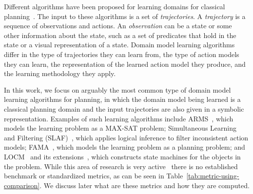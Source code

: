 \documentclass{article}
\theoremstyle{definition}
\theoremstyle{remark}
\newif\ifaddcomments
\newcommand{\todo}[1]{\ifaddcomments{\textcolor{red}{[TODO: #1]}}\fi}
\newcommand{\roni}[1]{\ifaddcomments{\textcolor{red}{[Roni: #1]}}\fi}
\newcommand{\yarin}[1]{\ifaddcomments{\textcolor{teal}{[Yarin: #1]}}\fi}
\newcommand{\cm}[1]{\ifaddcomments{\textcolor{olive}{[Christian: #1]}}\fi}
\begin{document}
Different algorithms have been proposed for learning domains for classical planning~\citep{macq,aineto2019learning,jimenez2012review}. 
The input to these algorithms is a set of \emph{trajectories}. 
A \emph{trajectory} is a sequence of observations and actions. 
An \emph{observation} can be a state or some other information about the state, 
such as a set of predicates that hold in the state or a visual representation of a state. 
Domain model learning algorithms differ in the type of trajectories they can learn from, the type of action models they can learn, the representation of the learned action model they produce, and the learning methodology they apply. 



In this work, we focus on arguably the most common type of domain model learning algorithms for planning, in which the domain model being learned is a classical planning domain and the input trajectories are also given in a symbolic representation. 
Examples of such learning algorithms include ARMS~\citep{yang2007learning}, which models the learning problem as a MAX-SAT problem; Simultaneous Learning and Filtering (SLAF)~\citep{amir2008learning}, which applies logical inference to filter inconsistent action models; FAMA~\citep{aineto2019learning}, which models the learning problem as a planning problem; 
and LOCM~\citep{cresswell2011generalised} and its extensions~\citep{cresswell2013acquiring,gregory2016domain}, which constructs state machines for the objects in the problem. 
While this area of research is very active~\citep{juba2021safe,mordoch2023safe,xi2024neuro,Lamanna24,LAMANNA2025104256} there is no established benchmark or standardized metrics, as can be seen in Table~\ref{tab:metric-using-comparison}. We discuss later what are these metrics and how they are computed. 
\end{document}
